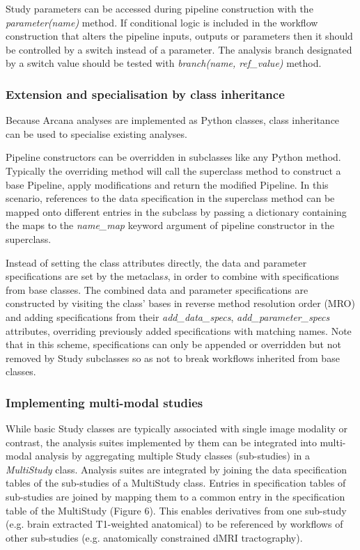 Study parameters can be accessed during pipeline construction with the
\emph{parameter(name)} method. If conditional logic is included in
the workflow construction that alters the pipeline inputs, outputs or
parameters then it should be controlled by a switch instead of a
parameter. The analysis branch designated by a switch value should be
tested with \emph{branch(name, ref\_value)} method.

\subsubsection{Extension and specialisation by class inheritance}
\label{extension-and-specialisation-by-class-inheritance}

Because Arcana analyses are implemented as Python classes, class
inheritance can be used to specialise existing analyses.

Pipeline constructors can be overridden in subclasses like any Python
method. Typically the overriding method will call the superclass method
to construct a base Pipeline, apply modifications and return the
modified Pipeline. In this scenario, references to the data
specification in the superclass method can be mapped onto different
entries in the subclass by passing a dictionary containing the maps to
the \emph{name\_map} keyword argument of pipeline constructor in the
superclass.

Instead of setting the class attributes directly, the data and parameter
specifications are set by the metaclas\emph{s}, in order to combine with
specifications from base classes. The combined data and parameter
specifications are constructed by visiting the class' bases in reverse
method resolution order (MRO) and adding specifications from their
\emph{add\_data\_specs}, \emph{add\_parameter\_specs} attributes,
overriding previously added specifications with matching names. Note
that in this scheme, specifications can only be appended or overridden
but not removed by Study subclasses so as not to break workflows
inherited from base classes.

\subsubsection{Implementing multi-modal
studies}
\label{implementing-multi-modal-studies}

While basic Study classes are typically associated with single image
modality or contrast, the analysis suites implemented by them can be
integrated into multi-modal analysis by aggregating multiple Study
classes (sub-studies) in a \emph{MultiStudy} class. Analysis suites are
integrated by joining the data specification tables of the sub-studies
of a MultiStudy class. Entries in specification tables of sub-studies
are joined by mapping them to a common entry in the specification table
of the MultiStudy (Figure 6). This enables derivatives from one
sub-study (e.g. brain extracted T1-weighted anatomical) to be referenced
by workflows of other sub-studies (e.g. anatomically constrained dMRI
tractography).


